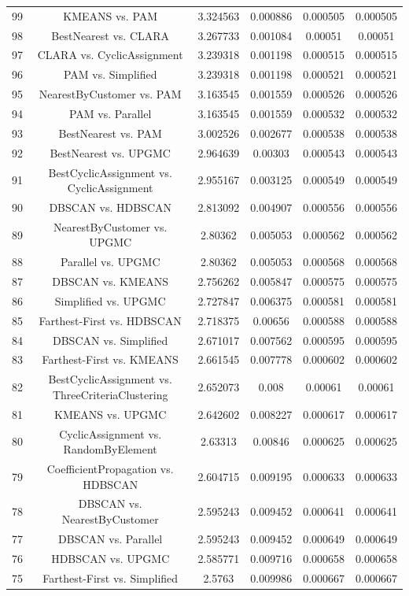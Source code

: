 \documentclass[a4paper,10pt]{article}
\begin{document}
\begin{landscape}
\begin{table}[!htp]
\begin{tabular}{cccccc}
99&KMEANS vs. PAM&3.324563&0.000886&0.000505&0.000505\\
98&BestNearest vs. CLARA&3.267733&0.001084&0.00051&0.00051\\
97&CLARA vs. CyclicAssignment&3.239318&0.001198&0.000515&0.000515\\
96&PAM vs. Simplified&3.239318&0.001198&0.000521&0.000521\\
95&NearestByCustomer vs. PAM&3.163545&0.001559&0.000526&0.000526\\
94&PAM vs. Parallel&3.163545&0.001559&0.000532&0.000532\\
93&BestNearest vs. PAM&3.002526&0.002677&0.000538&0.000538\\
92&BestNearest vs. UPGMC&2.964639&0.00303&0.000543&0.000543\\
91&BestCyclicAssignment vs. CyclicAssignment&2.955167&0.003125&0.000549&0.000549\\
90&DBSCAN vs. HDBSCAN&2.813092&0.004907&0.000556&0.000556\\
89&NearestByCustomer vs. UPGMC&2.80362&0.005053&0.000562&0.000562\\
88&Parallel vs. UPGMC&2.80362&0.005053&0.000568&0.000568\\
87&DBSCAN vs. KMEANS&2.756262&0.005847&0.000575&0.000575\\
86&Simplified vs. UPGMC&2.727847&0.006375&0.000581&0.000581\\
85&Farthest-First vs. HDBSCAN&2.718375&0.00656&0.000588&0.000588\\
84&DBSCAN vs. Simplified&2.671017&0.007562&0.000595&0.000595\\
83&Farthest-First vs. KMEANS&2.661545&0.007778&0.000602&0.000602\\
82&BestCyclicAssignment vs. ThreeCriteriaClustering&2.652073&0.008&0.00061&0.00061\\
81&KMEANS vs. UPGMC&2.642602&0.008227&0.000617&0.000617\\
80&CyclicAssignment vs. RandomByElement&2.63313&0.00846&0.000625&0.000625\\
79&CoefficientPropagation vs. HDBSCAN&2.604715&0.009195&0.000633&0.000633\\
78&DBSCAN vs. NearestByCustomer&2.595243&0.009452&0.000641&0.000641\\
77&DBSCAN vs. Parallel&2.595243&0.009452&0.000649&0.000649\\
76&HDBSCAN vs. UPGMC&2.585771&0.009716&0.000658&0.000658\\
75&Farthest-First vs. Simplified&2.5763&0.009986&0.000667&0.000667\\

\end{tabular}
\end{table}
\end{landscape}
\end{document}
